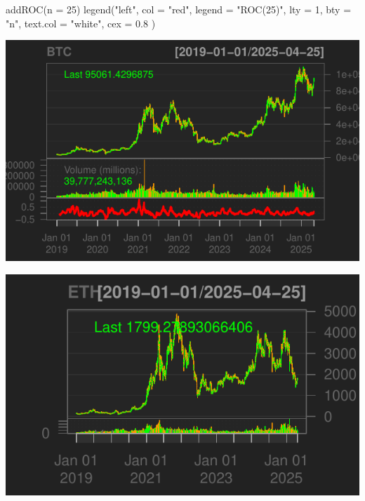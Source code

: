 \documentclass[]{tufte-handout}
\newenvironment{Shaded}{}{}
\newcommand{\AttributeTok}[1]{\textcolor[rgb]{0.49,0.56,0.16}{#1}}
\newcommand{\DecValTok}[1]{\textcolor[rgb]{0.25,0.63,0.44}{#1}}
\newcommand{\FloatTok}[1]{\textcolor[rgb]{0.25,0.63,0.44}{#1}}
\newcommand{\FunctionTok}[1]{\textcolor[rgb]{0.02,0.16,0.49}{#1}}
\newcommand{\NormalTok}[1]{#1}
\newcommand{\OtherTok}[1]{\textcolor[rgb]{0.00,0.44,0.13}{#1}}
\newcommand{\SpecialCharTok}[1]{\textcolor[rgb]{0.25,0.44,0.63}{#1}}
\newcommand{\StringTok}[1]{\textcolor[rgb]{0.25,0.44,0.63}{#1}}
\begin{document}
\begin{Shaded}
\begin{Highlighting}[]
\FunctionTok{addROC}\NormalTok{(}\AttributeTok{n =} \DecValTok{25}\NormalTok{)}
\FunctionTok{legend}\NormalTok{(}\StringTok{"left"}\NormalTok{,}
  \AttributeTok{col =} \StringTok{"red"}\NormalTok{, }\AttributeTok{legend =} \StringTok{"ROC(25)"}\NormalTok{, }\AttributeTok{lty =} \DecValTok{1}\NormalTok{, }\AttributeTok{bty =} \StringTok{"n"}\NormalTok{,}
  \AttributeTok{text.col =} \StringTok{"white"}\NormalTok{, }\AttributeTok{cex =} \FloatTok{0.8}
\NormalTok{)}
\end{Highlighting}
\end{Shaded}

\includegraphics{cripto_update_files/figure-latex/unnamed-chunk-12-2}

\begin{Shaded}
\end{Shaded}

\includegraphics{cripto_update_files/figure-latex/unnamed-chunk-12-3}
\end{document}
